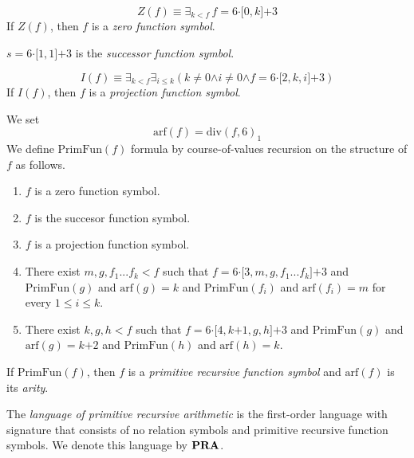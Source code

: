 \documentclass[10pt]{amsart}
\newcommand{\mexists}{\boldsymbol{\exists}}
\newcommand{\mand}{\boldsymbol{\wedge}}
\newcommand{\mle}{\boldsymbol{<}}
\newcommand{\mleq}{\boldsymbol{\leq}}
\newcommand{\meq}{\boldsymbol{=}}
\newcommand{\mneq}{\boldsymbol{\neq}}
\newcommand{\mplus}{\boldsymbol{+}}
\newcommand{\mdot}{\boldsymbol{\cdot}}
\begin{document}
\begin{definition}
	$$Z(f) \equiv \mexists_{k \mle f}\,f \meq 6\mdot \pmb{[}0,k\pmb{]} \mplus 3$$
	If $Z(f)$, then $f$ is a \textit{zero function symbol}.
\end{definition}

\begin{definition}
	$s \meq 6\mdot \pmb{[}1,1\pmb{]} \mplus 3$ is the \textit{successor function symbol}.
\end{definition}

\begin{definition}
	$$I(f) \equiv \mexists_{k \mle f}\mexists_{i \mleq k}\left(k\mneq 0 \mand i\mneq 0 \mand f \meq 6\mdot \pmb{[}2,k,i\pmb{]} \mplus 3\right)$$
	If $I(f)$, then $f$ is a \textit{projection function symbol}.
\end{definition}

\begin{definition}
	We set
	$$\mathrm{arf}(f) \meq \mathrm{div}(f,6)_1$$
	We define $\mathrm{PrimFun}(f)$ formula by course-of-values recursion on the structure of $f$ as follows.
	\begin{enumerate}[label=\textbf{(\arabic*)}, leftmargin=3.0em]
		\item $f$ is a zero function symbol.
		\item $f$ is the succesor function symbol.
		\item $f$ is a projection function symbol.
		\item There exist $m,g,f_1...f_k \mle f$ such that $f \meq 6\mdot \pmb{[}3,m,g,f_1...f_k\pmb{]} \mplus 3$ and $\mathrm{PrimFun}(g)$ and $\mathrm{arf}(g) \meq k$ and $\mathrm{PrimFun}(f_i)$ and $\mathrm{arf}(f_i) \meq m$ for every $1 \mleq i \mleq k$.
		\item There exist $k,g,h\mle f$ such that $f \meq 6 \mdot \pmb{[}4,k \mplus 1,g,h\pmb{]} \mplus 3$ and $\mathrm{PrimFun}(g)$ and $\mathrm{arf}(g) \meq k\mplus 2$ and $\mathrm{PrimFun}(h)$ and $\mathrm{arf}(h) \meq k$.
	\end{enumerate}
	If $\mathrm{PrimFun}(f)$, then $f$ is a \textit{primitive recursive function symbol} and $\mathrm{arf}(f)$ is its \textit{arity}.
\end{definition}

\begin{definition}
	The \textit{language of primitive recursive arithmetic} is the first-order language with signature that consists of no relation symbols and primitive recursive function symbols. We denote this language by $\mathbf{PRA}$.
\end{definition}
\end{document}
